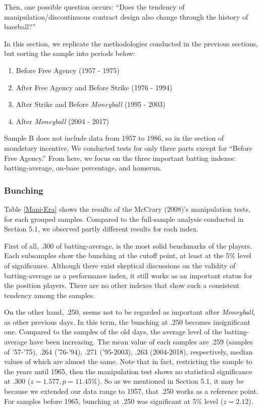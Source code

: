 \documentclass[dvipdfmx, 12pt]{article}
\begin{document}
Then, one possible question occurs: ``Does the tendency of manipulation/discoutinuous contract design also change through the history of baseball?''

In this section, we replicate the methodologies conducted in the previous sections, but sorting the sample into periods below:

\begin{enumerate}
  \item Before Free Agency (1957 - 1975)

  \item After Free Agency and Before Strike (1976 - 1994)

  \item After Strike and Before \textit{Moneyball} (1995 - 2003)

  \item After \textit{Moneyball} (2004 - 2017)
\end{enumerate}

Sample B does not include data from 1957 to 1986, so in the section of mondetary incentive, We conducted tests for only three parts except for ``Before Free Agency.'' From here, we focus on the three important batting indexes: batting-average, on-base percentage, and homerun.

\subsubsection{Bunching}

Table \ref{Mani-Era} shows the results of the McCrary (2008)'s manipulation tests, for each grouped samples. Compared to the full-sample analysis conducted in Section 5.1, we observed partly different results for each index.

First of all, .300 of batting-average, is the most solid benchmarks of the players. Each subsamples show the bunching at the cutoff point, at least at the 5\% level of significance. Although there exist skeptical discussions on the validity of batting-average as a performance index, it still works as an important status for the position players. There are no other indexes that show such a consistent tendency among the samples.

On the other hand, .250, seems not to be regarded as important after \textit{Moneyball}, as other previous days. In this term, the bunching at .250 becomes insignificant one. Compared to the samples of the old days, the average level of the batting-average have been increasing. The mean value of each samples are .259 (samples of '57-'75), .264 ('76-'94), .271 ('95-2003), .263 (2004-2018), respectively, median values of which are almost the same. Note that in fact, restricting the sample to the years until 1965, then the manipulation test shows no statistical significance at .300 ($z = 1.577, p = 11.45\% $). So as we mentioned in Section 5.1, it may be because we extended our data range to 1957, that .250 works as a reference point. For samples before 1965, bunching at .250 was significant at 5\% level ($z = 2.12$).
\end{document}
